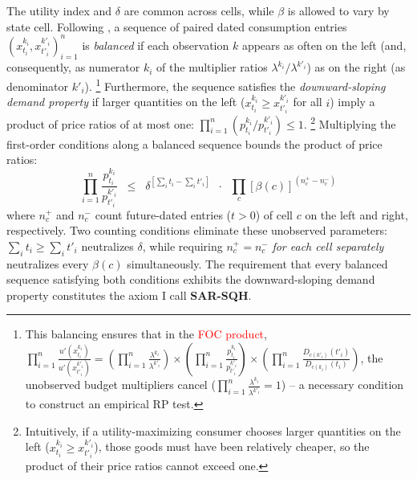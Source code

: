 \documentclass[11pt,a4paper]{article}
\theoremstyle{plain}
\theoremstyle{definition}
\begin{document}
The utility index and $\delta$ are common across cells, while $\beta$ is allowed to vary by state cell.
Following \citet{eis2020}, a sequence of paired dated consumption entries $(x_{t_i}^{k_i}, x_{t'_i}^{k'_i})_{i=1}^n$ is \emph{balanced} if each observation $k$ appears as often on the left (and, consequently, as numerator $k_i$ of the multiplier ratios $\lambda^{k_i}/\lambda^{k'_i}$) as on the right (as denominator $k'_i$).
\footnote{This balancing ensures that in the \textcolor{red}{FOC product}, $\prod_{i=1}^n \frac{u'(x_{t_i}^{k_i})}{u'(x_{t'_i}^{k'_i})} = \left(\prod_{i=1}^n \frac{\lambda^{k_i}}{\lambda^{k'_i}}\right) \times \left(\prod_{i=1}^n \frac{p_{t_i}^{k_i}}{p_{t'_i}^{k'_i}}\right) \times \left(\prod_{i=1}^n \frac{D_{c(k'_i)}(t'_i)}{D_{c(k_i)}(t_i)}\right)$, the unobserved budget multipliers cancel ($\prod_{i=1}^n \frac{\lambda^{k_i}}{\lambda^{k'_i}} = 1$) -- a necessary condition to construct an empirical RP test.} 
Furthermore, the sequence satisfies the \emph{downward-sloping demand property} if larger quantities on the left ($x_{t_i}^{k_i} \ge x_{t'_i}^{k'_i}$ for all $i$) imply a product of price ratios of at most one: $\prod_{i=1}^n (p_{t_i}^{k_i} / p_{t'_i}^{k'_i}) \le 1$.
\footnote{Intuitively, if a utility-maximizing consumer chooses larger quantities on the left ($x_{t_i}^{k_i} \ge x_{t'_i}^{k'_i}$), those goods must have been relatively cheaper, so the product of their price ratios cannot exceed one.}
Multiplying the first-order conditions along a balanced sequence bounds the product of price ratios:
{\setlength{\abovedisplayskip}{5pt} \setlength{\belowdisplayskip}{5pt}
\[
\prod_{i=1}^n \frac{p_{t_i}^{k_i}}{p_{t'_i}^{k'_i}} 
\;\;\le\;\; 
\delta^{\left[ \sum_i t_i - \sum_i t'_i \right]} 
\;\;\cdot\;\; 
\prod_c \left[ \beta(c) \right]^{\left( n_c^+ - n_c^- \right)}
\]}
where $n_c^+$ and $n_c^-$ count future-dated entries ($t > 0$) of cell $c$ on the left and right, respectively. Two counting conditions eliminate these unobserved parameters: $\sum_i t_i \ge \sum_i t'_i$ neutralizes $\delta$, while requiring $n_c^+ = n_c^-$ \emph{for each cell separately} neutralizes every $\beta(c)$ simultaneously. The requirement that every balanced sequence satisfying both conditions exhibits the downward-sloping demand property constitutes the axiom I call \textbf{SAR-SQH}.
\end{document}
